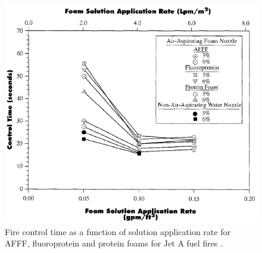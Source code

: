 \documentclass[12pt]{report}
\begin{document}
\begin{figure}[H]
    \centering
    \includegraphics[width=\textwidth]{fire_control_time_fuel_fires.png}
    \caption{Fire control time as a function of solution application rate for AFFF, fluoroprotein and protein foams for Jet A fuel fires \cite{geyer1972evaluation}.}
    \label{ch2:figure:fuel}
\end{figure}
\end{document}
